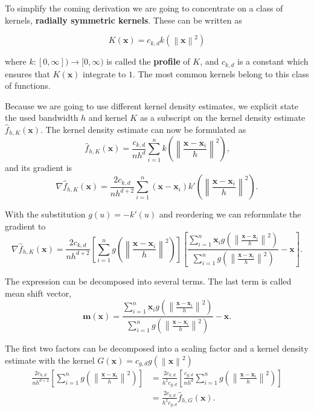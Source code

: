 \documentclass{article}
\newcommand{\norm}[1]{\left\lVert#1\right\rVert}
\begin{document}
To simplify the coming derivation we are going to concentrate on a class of kernels, \textbf{radially symmetric kernels}. These can be written as

\begin{equation}
	K(\bm{x}) = c_{k,d} k(\norm{\bm{x}}^2)
\end{equation}

where $k : [0, \infty]) \rightarrow [0, \infty)$ is called the \textbf{profile} of $K$, and $c_{k,d}$ is a constant which ensures that $K(\bm{x})$ integrate to $1$. The most common kernels belong to this class of functions.

Because we are going to use different kernel density estimates, we explicit state the used bandwidth $h$ and kernel $K$ as a subscript on the kernel density estimate $\hat{f}_{h,K}(\bm{x})$. The kernel density estimate can now be formulated as
\begin{equation}
	\hat{f}_{h,K}(\bm{x}) = \frac{c_{k,d}}{nh^d} \sum_{i=1}^n k\left(\norm{\frac{\bm{x} - \bm{x}_i}{h}}^2 \right)\text{,}
	\label{eq:kernel-density-estimate-radial-symetric}
\end{equation}
and its gradient is
\begin{equation}
	\nabla \hat{f}_{h,K}(\bm{x}) = \frac{2c_{k,d}}{nh^{d+2}} \sum_{i=1}^n (\bm{x} - \bm{x}_i)k'\left(\norm{\frac{\bm{x} - \bm{x}_i}{h}}^2 \right)\text{.}
	\label{eq:kernel-density-gradient-estimate-radial-symetric}
\end{equation}

With the substitution $g(u) = -k'(u)$ and reordering we can reformulate the gradient to
\begin{equation}
	\nabla \hat{f}_{h,K}(\bm{x}) = \frac{2c_{k,d}}{nh^{d+2}} \left[\sum_{i=1}^n g\left(\norm{\frac{\bm{x} - \bm{x}_i}{h}}^2 \right)\right] \left[\frac{\sum_{i=1}^n \bm{x}_i g\left(\norm{\frac{\bm{x} - \bm{x}_i}{h}}^2 \right)}{\sum_{i=1}^n g\left(\norm{\frac{\bm{x} - \bm{x}_i}{h}}^2 \right)} - \bm{x}\right]\text{.}
\end{equation}

The expression can be decomposed into several terms. The last term is called mean shift vector,
\begin{equation}
	\bm{m}(\bm{x}) = \frac{\sum_{i=1}^n \bm{x}_i g\left(\norm{\frac{\bm{x} - \bm{x}_i}{h}}^2 \right)}{\sum_{i=1}^n g\left(\norm{\frac{\bm{x} - \bm{x}_i}{h}}^2 \right)} - \bm{x}\text{.}
\end{equation}

The first two factors can be decomposed into a scaling factor and a kernel density estimate with the kernel $G(\bm{x}) = c_{g,d} g(\norm{\bm{x}}^2)$
\begin{align}
	\frac{2c_{k,d}}{nh^{d+2}} \left[\sum_{i=1}^n g\left(\norm{\frac{\bm{x} - \bm{x}_i}{h}}^2 \right)\right] &= \frac{2c_{k,d}}{h^2c_{g,d}} \left[\frac{c_{g,d}}{nh^d} \sum_{i=1}^n g\left(\norm{\frac{\bm{x} - \bm{x}_i}{h}}^2 \right) \right]\\
	&= \frac{2c_{k,d}}{h^2c_{g,d}} \hat{f}_{h,G}(\bm{x})\text{.}
\end{align}
\end{document}
